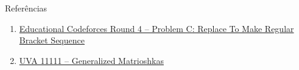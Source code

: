 \begin{frame}[fragile]{Referências}

    \begin{enumerate}
        \item \href{https://codeforces.com/problemset/problem/612/C}{Educational Codeforces Round 4 -- Problem C: Replace To Make Regular Bracket Sequence}

        \item \href{https://uva.onlinejudge.org/index.php?option=com_onlinejudge&Itemid=8&page=show_problem&category=0&problem=2052&mosmsg=Submission+received+with+ID+23047451}{UVA 11111 -- Generalized Matrioshkas}

    \end{enumerate}

\end{frame}
